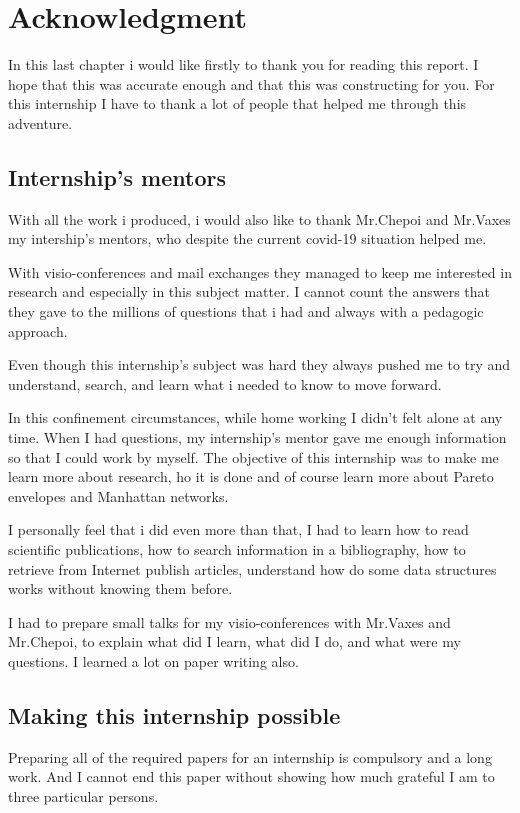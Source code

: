 \chapter{Acknowledgment}

In this last chapter i would like firstly to thank you for reading this report. I hope that this was accurate enough and that this was constructing for you. For this internship I have to thank a lot of people that helped me through this adventure.\newline

\section{Internship's mentors}
With all the work i produced, i would also like to thank Mr.Chepoi and Mr.Vaxes my intership's mentors, who despite the current covid-19 situation helped me. 

With visio-conferences and mail exchanges they managed to keep me interested in research and especially in this subject matter. I cannot count the answers that they gave to the millions of questions that i had and always with a pedagogic approach.

Even though this internship's subject was hard they always pushed me to try and understand, search, and learn what i needed to know to move forward.

In this confinement circumstances, while home working I didn't felt alone at any time. When I had questions, my internship's mentor gave me enough information so that I could work by myself. The objective of this internship was to make me learn more about research, ho it is done and of course learn more about Pareto envelopes and Manhattan networks.\newline

I personally feel that i did even more than that, I had to learn how to read scientific publications, how to search information in a bibliography, how to retrieve from Internet publish articles, understand how do some data structures works without knowing them before. 

I had to prepare small talks for my visio-conferences with Mr.Vaxes and Mr.Chepoi, to explain what did I learn, what did I do, and what were my questions. I learned a lot on paper writing also.

\section{Making this internship possible}
Preparing all of the required papers for an internship is compulsory and a long work. And I cannot end this paper without showing how much grateful I am to three particular persons.


